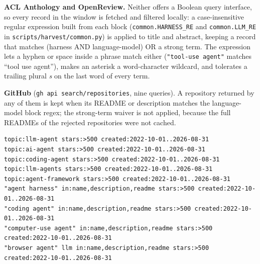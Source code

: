 \noindent\textbf{ACL Anthology and OpenReview.} Neither offers a Boolean query interface, so every
record in the window is fetched and filtered locally: a case-insensitive regular expression built
from each block (\texttt{common.HARNESS\_RE} and \texttt{common.LLM\_RE} in
\texttt{scripts/harvest/common.py}) is applied to title and abstract, keeping a record that matches
(harness AND language-model) OR a strong term. The expression lets a hyphen or space inside a phrase
match either (\texttt{"tool-use agent"} matches ``tool use agent''), makes an asterisk a word-character
wildcard, and tolerates a trailing plural \emph{s} on the last word of every term.

\noindent\textbf{GitHub} (\texttt{gh api search/repositories}, nine queries). A repository returned by
any of them is kept when its README or description matches the language-model block regex; the
strong-term waiver is not applied, because the full READMEs of the rejected repositories were not
cached.
{\footnotesize
\begin{verbatim}
topic:llm-agent stars:>500 created:2022-10-01..2026-08-31
topic:ai-agent stars:>500 created:2022-10-01..2026-08-31
topic:coding-agent stars:>500 created:2022-10-01..2026-08-31
topic:llm-agents stars:>500 created:2022-10-01..2026-08-31
topic:agent-framework stars:>500 created:2022-10-01..2026-08-31
"agent harness" in:name,description,readme stars:>500 created:2022-10-01..2026-08-31
"coding agent" in:name,description,readme stars:>500 created:2022-10-01..2026-08-31
"computer-use agent" in:name,description,readme stars:>500 created:2022-10-01..2026-08-31
"browser agent" llm in:name,description,readme stars:>500 created:2022-10-01..2026-08-31
\end{verbatim}
}

